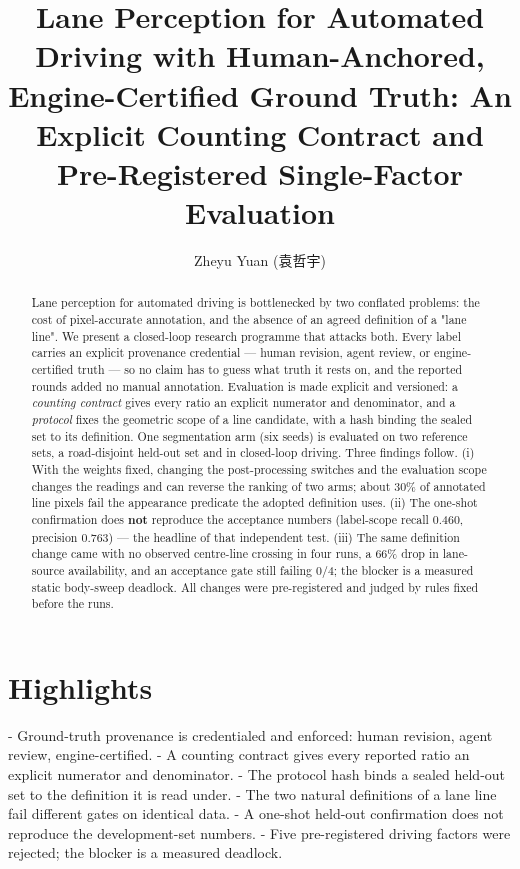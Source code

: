 \documentclass[journal]{IEEEtran}
\title{Lane Perception for Automated Driving with Human-Anchored, Engine-Certified Ground Truth: An Explicit Counting Contract and Pre-Registered Single-Factor Evaluation}
\author{Zheyu Yuan (袁哲宇)}
\begin{document}
\maketitle
\begin{abstract}
Lane perception for automated driving is bottlenecked by two conflated problems: the cost of pixel-accurate annotation, and the absence of an agreed definition of a "lane line". We present a closed-loop research programme that attacks both. Every label carries an explicit provenance credential --- human revision, agent review, or engine-certified truth --- so no claim has to guess what truth it rests on, and the reported rounds added no manual annotation. Evaluation is made explicit and versioned: a \emph{counting contract} gives every ratio an explicit numerator and denominator, and a \emph{protocol} fixes the geometric scope of a line candidate, with a hash binding the sealed set to its definition. One segmentation arm (six seeds) is evaluated on two reference sets, a road-disjoint held-out set and in closed-loop driving. Three findings follow. (i) With the weights fixed, changing the post-processing switches and the evaluation scope changes the readings and can reverse the ranking of two arms; about 30\% of annotated line pixels fail the appearance predicate the adopted definition uses. (ii) The one-shot confirmation does \textbf{not} reproduce the acceptance numbers (label-scope recall 0.460, precision 0.763) --- the headline of that independent test. (iii) The same definition change came with no observed centre-line crossing in four runs, a 66\% drop in lane-source availability, and an acceptance gate still failing 0/4; the blocker is a measured static body-sweep deadlock. All changes were pre-registered and judged by rules fixed before the runs.
\end{abstract}

\section*{Highlights}
- Ground-truth provenance is credentialed and enforced: human revision, agent review, engine-certified.
- A counting contract gives every reported ratio an explicit numerator and denominator.
- The protocol hash binds a sealed held-out set to the definition it is read under.
- The two natural definitions of a lane line fail different gates on identical data.
- A one-shot held-out confirmation does not reproduce the development-set numbers.
- Five pre-registered driving factors were rejected; the blocker is a measured deadlock.
\end{document}
